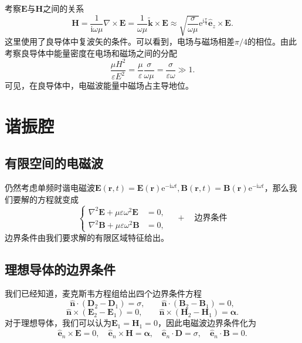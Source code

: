 \documentclass[UTF8]{ctexbook}
\newcommand{\e}{\mathrm{e}}
\renewcommand{\b}{\boldsymbol}
\renewcommand{\i}{\mathrm{i}}
\numberwithin{equation}{chapter}
\begin{document}
	考察$\b{E}$与$\b{H}$之间的关系
	\[\b{H}=\frac{1}{\i\omega \mu}\nabla\times\b{E}=\frac{1}{\omega\mu}\tilde{\b{k}}\times\b{E}\approx\sqrt{\frac{\sigma}{\omega\mu}}\e^{\i\frac{\pi}{4}}\hat{\b{e}}_z\times\b{E}.\]
	这里使用了良导体中复波矢的条件。可以看到，电场与磁场相差$\pi/4$的相位。由此考察良导体中能量密度在电场和磁场之间的分配
	\[\frac{\mu H^2}{\varepsilon E^2}=\frac{\mu}{\varepsilon}\frac{\sigma}{\omega \mu}=\frac{\sigma}{\varepsilon\omega} \gg 1.\]
	可见，在良导体中，电磁波能量中磁场占主导地位。
	
	\section{谐振腔}
	
	\subsection{有限空间的电磁波}
	仍然考虑单频时谐电磁波$\b{E}(\b{r},t)=\b{E}(\b{r})\e^{-\i\omega t},\b{B}(\b{r},t)=\b{B}(\b{r})\e^{-\i\omega t}$，那么我们要解的方程就变成
	\[\left\{\begin{aligned}
		\nabla^2\b{E}+\mu\varepsilon\omega^2\b{E}&=0,\\
		\nabla^2\b{B}+\mu\varepsilon\omega^2\b{B}&=0,
	\end{aligned}\right.\quad + \quad \text{边界条件}\]
	边界条件由我们要求解的有限区域特征给出。
	
	\subsection{理想导体的边界条件}
	我们已经知道，麦克斯韦方程组给出四个边界条件方程
	\[\hat{\b{n}}\cdot(\b{D}_2-\b{D}_1)=\sigma,\qquad \hat{\b{n}}\cdot(\b{B}_2-\b{B}_1)=0,\]
	\[\hat{\b{n}}\times(\b{E}_2-\b{E}_1)=0,\qquad \hat{\b{n}}\times(\b{H}_2-\b{H}_1)=\b{\alpha}.\]
	对于理想导体，我们可以认为$\b{E}_1=\b{H}_1=0$，因此电磁波边界条件化为
	\[\hat{\b{e}}_n\times\b{E}=0,\quad \hat{\b{e}}_n\times\b{H}=\b{\alpha},\quad \hat{\b{e}}_n\cdot\b{D}=\sigma,\quad \hat{\b{e}}_n\cdot\b{B}=0.\]
	
\end{document}
